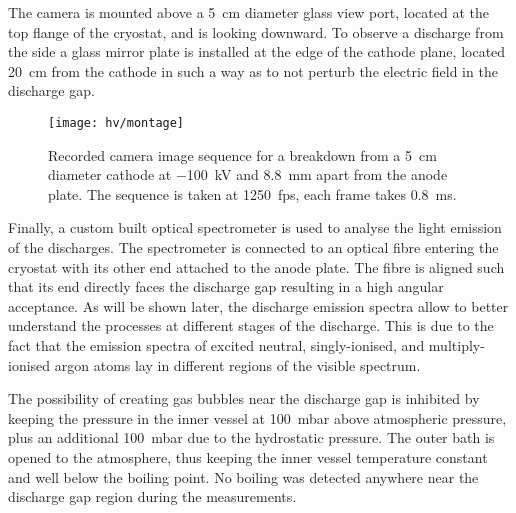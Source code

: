 The camera is mounted above a \SI{5}{\centi\metre} diameter glass view port, located at the top flange of the cryostat, and is looking downward.
To observe a discharge from the side a glass mirror plate is installed at the edge of the cathode plane, located \SI{20}{\centi\metre} from the cathode in such a way as to not perturb the electric field in the discharge gap. 

\begin{figure}[tbp]
	\centering	
	\texttt{[image: hv/montage]}
	\caption[ test high-speed footage]{%
		Recorded camera image sequence for a breakdown from a \SI{5}{\centi\metre} diameter cathode at \SI{-100}{\kilo\volt} and \SI{8.8}{\milli\metre} apart from the anode plate.
		The sequence is taken at \SI{1250}{fps}, each frame takes \SI{0.8}{\milli\second}.
	}
	\label{fig:hv_images}
\end{figure}

Finally, a custom built optical spectrometer is used to analyse the light emission of the discharges.
The spectrometer is connected to an optical fibre entering the cryostat with its other end attached to the anode plate.
The fibre is aligned such that its end directly faces the discharge gap resulting in a high angular acceptance.
As will be shown later, the discharge emission spectra allow to better understand the processes at different stages of the discharge.
This is due to the fact that the emission spectra of excited neutral, singly-ionised, and multiply-ionised argon atoms lay in different regions of the visible spectrum.

The possibility of creating gas bubbles near the discharge gap is inhibited by keeping the pressure in the inner vessel at \SI{100}{\milli\bar} above atmospheric pressure, plus an additional \SI{100}{\milli\bar} due to the hydrostatic pressure.
The outer bath is opened to the atmosphere, thus keeping the inner vessel temperature constant and well below the boiling point.
No boiling was detected anywhere near the discharge gap region during the measurements.

